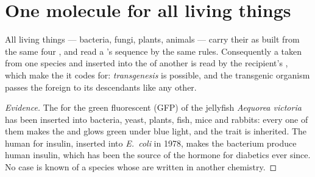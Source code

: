 \section{One molecule for all living things}

\begin{proposition}\label{prop:g10:universal-dna:universal}
All living things --- bacteria, fungi, plants, animals --- carry their
 as  built from the same four , and
read a 's sequence by the same rules. Consequently a  taken
from one species and inserted into the  of another is read by the
recipient's , which make the  it codes for:
\emph{transgenesis} is possible, and the
transgenic organism passes the foreign  to its descendants like
any other.
\end{proposition}
\begin{proof}[Evidence]
The  for the green fluorescent  (GFP) of the jellyfish
\emph{Aequorea victoria} has been inserted into bacteria, yeast, plants,
fish, mice and rabbits: every one of them makes the  and glows
green under blue light, and the trait is inherited. The human  for
insulin, inserted into \emph{E.~coli} in 1978, makes the bacterium
produce human insulin, which has been the source of the hormone for
diabetics ever since. No case is known of a species whose  are
written in another chemistry.
\end{proof}

